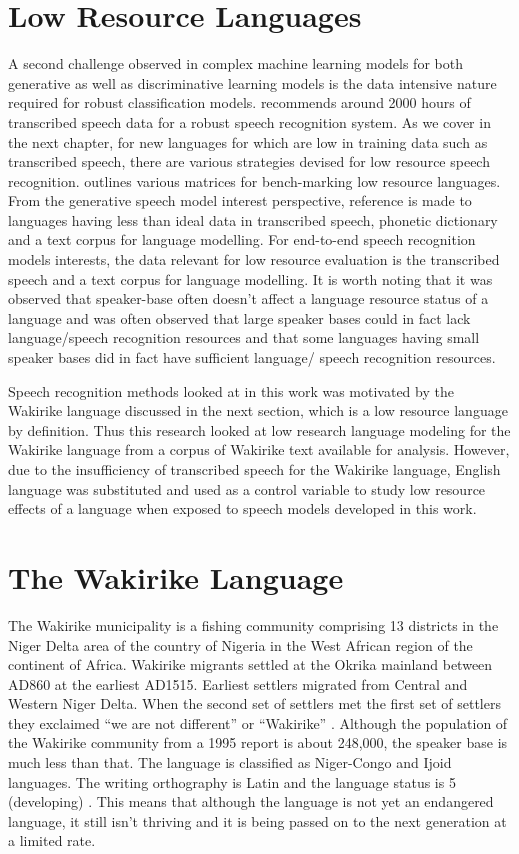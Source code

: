 \section{Low Resource Languages}
A second challenge observed in complex machine learning models for both generative as well as discriminative learning models is the data intensive nature required for robust classification models. \cite{saon2015ibm} recommends around 2000 hours of transcribed speech data for a robust speech recognition system. As we cover in the next chapter, for new languages for which are low in training data such as transcribed speech, there are various strategies devised for low resource speech recognition. \cite{besacier2014automatic} outlines various matrices for bench-marking low resource languages.  From the generative speech model interest perspective,  reference is made to languages having less than ideal data in transcribed speech, phonetic dictionary and a text corpus for language modelling.  For end-to-end speech recognition models interests, the data relevant for low resource evaluation is the transcribed speech and a text corpus for language modelling.  It is worth noting that it was observed \citep{besacier2014automatic} that speaker-base often doesn't affect a language resource status of a language and was often observed that large speaker bases could in fact lack language/speech recognition resources and that some languages having small speaker bases did in fact have sufficient language/ speech recognition resources.

Speech recognition methods looked at in this work was motivated by the Wakirike language discussed in the next section, which is a low resource language by definition.  Thus this research looked at low research language modeling for the Wakirike language from a corpus of Wakirike text available for analysis.  However, due to the insufficiency of transcribed speech for the Wakirike language, English language was substituted and used as a control variable to study low resource effects of a language when exposed to speech models developed in this work.

\section{The Wakirike Language}
The Wakirike municipality is a fishing community comprising 13 districts in the Niger Delta area of the country of Nigeria in the West African region of the continent of Africa.  Wakirike migrants settled at the Okrika mainland between AD860 at the earliest AD1515.  Earliest settlers migrated from Central and Western Niger Delta.  When the second set of settlers met the first set of settlers they exclaimed “we are not different” or “Wakirike” \citep{wakirike}.  Although the population of the Wakirike community from a 1995 report \citep{ethnologue} is about 248,000, the speaker base is  much less than that.  The language is classified as Niger-Congo and Ijoid languages.  The writing orthography is Latin and the language status is 5 (developing) \citep{ethnologue}.  This means that although the language is not yet an endangered language, it still isn't thriving and it is being passed on to the next generation at a limited rate.

